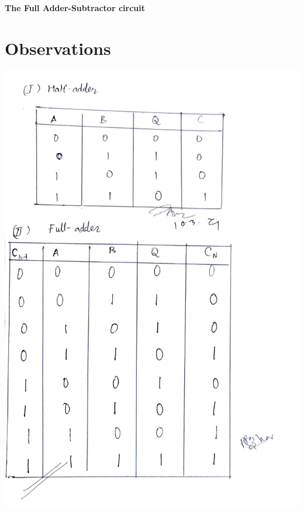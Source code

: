 \begin{center}
    \textbf{The Full Adder-Subtractor circuit}
\end{center}
\clearpage
\section{Observations}
\begin{center}
    \includegraphics[scale = 0.14]{exp5tab1_1.jpg}
\end{center}
